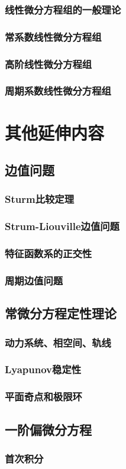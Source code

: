 \documentclass[lang=cn,10pt]{elegantbook}
\begin{document}
\section{线性微分方程组的一般理论}
\section{常系数线性微分方程组}
\section{高阶线性微分方程组}
\section{周期系数线性微分方程组}
\newpage

\part{其他延伸内容}
\chapter{边值问题}
\section{Sturm比较定理}
\section{Strum-Liouville边值问题}
\section{特征函数系的正交性}
\section{周期边值问题}
\newpage

\chapter{常微分方程定性理论}
\section{动力系统、相空间、轨线}
\section{Lyapunov稳定性}
\section{平面奇点和极限环}
\newpage

\chapter{一阶偏微分方程}
\section{首次积分}
\end{document}
